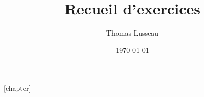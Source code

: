 \documentclass[11pt,a4paper,openany]{book}
\title{Recueil d'exercices\\\TitreChapitreTD}
\author{Thomas Lusseau}
\date{\today}
\begin{document}
\frontmatter
\maketitle
\tableofcontents
\mainmatter

\newcommand{\repExo}{ALL_TD}
\newcommand{\nomExo}{ALL_TD}
\ifnum{}\relax
  \proftrue
\else
  \proffalse
\fi
\livrettrue
\collefalse
\normaltrue
\setcounter{cptApplication}{1}
\setcounter{cptTD}{1}

\providecommand{\td}{}
\providecommand{\exer}[1]{}
\makeatletter
{}
\makeatother
{}[chapter]
\renewcommand{\theexerciseentry}{\thechapter.\arabic{exerciseentry}}
\providecommand{\theHquestion}{}
\renewcommand{\theHquestion}{\theHchapter.\arabic{exerciseentry}.\arabic{question}}

\newcommand{\ExerciseTitle}[1]{%
  \par\medskip
  \begin{tcolorbox}[
    enhanced,
    breakable,
    colback=SIlightblue,
    colframe=SIblue,
    boxrule=.8pt,
    arc=1.5mm,
    left=3mm,
    right=3mm,
    top=2mm,
    bottom=2mm
  ]
    {\large\bfseries\color{SIblue}Exercice \theexerciseentry}\par\smallskip
    {\bfseries #1}
  \end{tcolorbox}%
}

\renewcommand{\exer}[1]{\ExerciseTitle{#1}}

\providecommand{\n}{\par}
\providecommand{\nsetcounter}{\par\setcounter}
\providecommand{\nRessources}{\par Ressources}

\providecommand{\xpComp}[2]{}
\renewcommand{\xpComp}[2]{\textbf{#1--#2}}
\providecommand{\degres}{}
\renewcommand{\degres}{\ensuremath{^{\circ}}}
\providecommand{\faClock}{}
\renewcommand{\faClock}{\textnormal{Durée :}}

\renewcommand{\url}[1]{\href{#1}{Accéder au lien en ligne}}



\backmatter
\printindex
\end{document}

